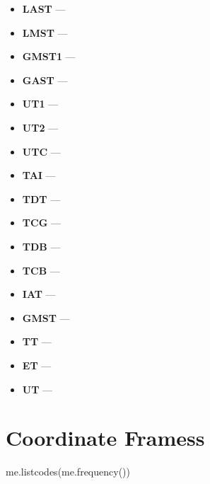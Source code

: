 \begin{itemize}
\item {\bf LAST} ---  

\item {\bf LMST} ---  

\item {\bf GMST1} ---  

\item {\bf GAST} ---  

\item {\bf UT1} ---  

\item {\bf UT2} ---  

\item {\bf UTC} ---  

\item {\bf TAI} ---  

\item {\bf TDT} ---  

\item {\bf TCG} ---  

\item {\bf TDB} ---  

\item {\bf TCB} ---  

\item {\bf IAT} ---  

\item {\bf GMST} ---  

\item {\bf TT} ---  

\item {\bf ET} ---  

\item {\bf UT} ---  
\end{itemize}




\section{Coordinate Framess}
me.listcodes(me.frequency())

